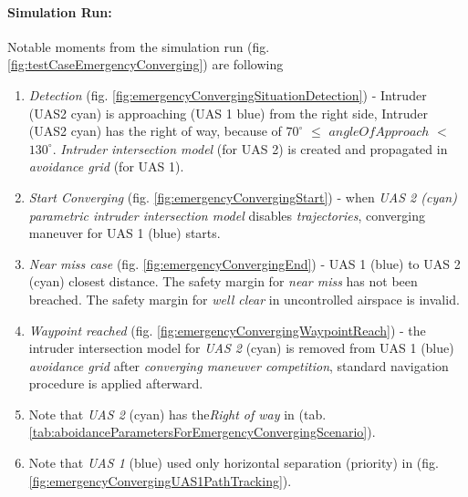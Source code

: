 \paragraph{Simulation Run:} Notable moments from the simulation run (fig. \ref{fig:testCaseEmergencyConverging}) are following
\begin{enumerate}
    \item \emph{Detection} (fig. \ref{fig:emergencyConvergingSituationDetection}) - Intruder (UAS2 cyan) is approaching (UAS 1 blue) from the right side, Intruder (UAS2 cyan) has the right of way, because of $70^{\circ}$ $\le$ $angleOfApproach$ $<$ $130^{\circ}$. \emph{Intruder intersection model} (for UAS 2) is created and propagated in \emph{avoidance grid} (for UAS 1). 
            
    \item \emph{Start Converging} (fig. \ref{fig:emergencyConvergingStart}) - when \emph{UAS 2 (cyan) parametric intruder intersection model} disables \emph{trajectories}, converging maneuver for UAS 1 (blue) starts.
    
    \item \emph{Near miss case} (fig. \ref{fig:emergencyConvergingEnd}) - UAS 1 (blue) to UAS 2 (cyan) closest distance. The safety margin for \emph{near miss} has not been breached. The safety margin for \emph{well clear} in uncontrolled airspace is invalid.
    
    \item \emph{Waypoint reached} (fig. \ref{fig:emergencyConvergingWaypointReach}) - the intruder intersection model for \emph{UAS 2} (cyan) is removed from UAS 1 (blue) \emph{avoidance grid} after \emph{converging maneuver competition}, standard navigation procedure is applied afterward.
    
    \item Note that \emph{UAS 2} (cyan) has the\emph{Right of way} in (tab. \ref{tab:aboidanceParametersForEmergencyConvergingScenario}).
    
    \item Note that \emph{UAS 1} (blue) used only horizontal separation (priority) in (fig. \ref{fig:emergencyConvergingUAS1PathTracking}).
\end{enumerate}


